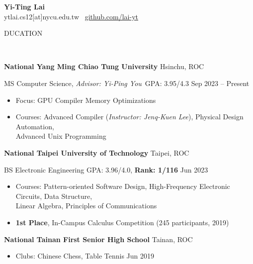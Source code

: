 \documentclass[11pt]{article}
\begin{document}
\begin{center}
    \textbf{\Large Yi-Ting Lai}\\
    ytlai.cs12[at]nycu.edu.tw \textbullet \ \href{https://github.com/lai-yt}{github.com/lai-yt}
\end{center}

\vspace{0.5pt}

\begin{center}
    \scalebox{1.3}{E}DUCATION\raggedright \,\hrulefill
\end{center}

\textbf{National Yang Ming Chiao Tung University} \hfill Hsinchu, ROC

MS Computer Science, \textit{Advisor: Yi-Ping You} \,\qquad GPA: 3.95/4.3 \hfill Sep 2023 -- Present

\begin{itemize}[noitemsep, topsep=0pt, partopsep=0pt, parsep=0pt, leftmargin=*]
    \item Focus: GPU Compiler Memory Optimizations
    \item Courses: Advanced Compiler (\textit{Instructor: Jenq-Kuen Lee}), Physical Design Automation,\\Advanced Unix Programming
\end{itemize}

\vspace{6pt}

\textbf{National Taipei University of Technology} \hfill Taipei, ROC

BS Electronic Engineering \enskip \qquad \qquad \qquad \qquad \qquad GPA: 3.96/4.0, \textbf{Rank: 1/116} \hfill Jun 2023
\begin{itemize}[noitemsep, topsep=0pt, partopsep=0pt, parsep=0pt, leftmargin=*]
    \item Courses: Pattern-oriented Software Design, High-Frequency Electronic Circuits, Data Structure,\\Linear Algebra, Principles of Communications
    \item \textbf{1st Place}, In-Campus Calculus Competition (245 participants, 2019)
\end{itemize}

\vspace{6pt}

\textbf{National Tainan First Senior High School} \hfill    Tainan, ROC

\begin{itemize}[noitemsep, topsep=0pt, partopsep=0pt, parsep=0pt, leftmargin=*]
    \item Clubs: Chinese Chess, Table Tennis \hfill Jun 2019
\end{itemize}
\end{document}
